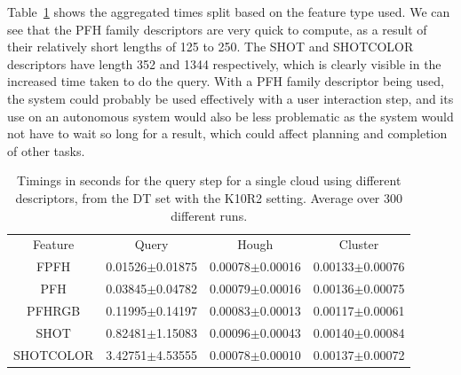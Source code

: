 \documentclass[11pt,a4paper]{kth-mag}
\begin{document}
Table~\ref{tbl:agg_time_desc} shows the aggregated times split based on the
feature type used. We can see that the PFH family descriptors are very quick to
compute, as a result of their relatively short lengths of 125 to 250. The SHOT
and SHOTCOLOR descriptors have length 352 and 1344 respectively, which is
clearly visible in the increased time taken to do the query. With a PFH family
descriptor being used, the system could probably be used effectively with a user
interaction step, and its use on an autonomous system would also be less
problematic as the system would not have to wait so long for a result, which
could affect planning and completion of other tasks.
\begin{table}
  \centering
  \begin{tabular}{c|ccc}
    Feature & Query & Hough & Cluster\\
    FPFH & 0.01526$\pm$0.01875 & 0.00078$\pm$0.00016 & 0.00133$\pm$0.00076\\
    PFH & 0.03845$\pm$0.04782 & 0.00079$\pm$0.00016 & 0.00136$\pm$0.00075\\
    PFHRGB & 0.11995$\pm$0.14197 & 0.00083$\pm$0.00013 & 0.00117$\pm$0.00061\\
    SHOT & 0.82481$\pm$1.15083 & 0.00096$\pm$0.00043 & 0.00140$\pm$0.00084\\
    SHOTCOLOR & 3.42751$\pm$4.53555 & 0.00078$\pm$0.00010 & 0.00137$\pm$0.00072\\
  \end{tabular}
  \caption{Timings in seconds for the query step for a single cloud using different
    descriptors, from the DT set with the K10R2 setting.
    Average over 300 different runs.}
  \label{tbl:agg_time_desc}
\end{table}
\end{document}
